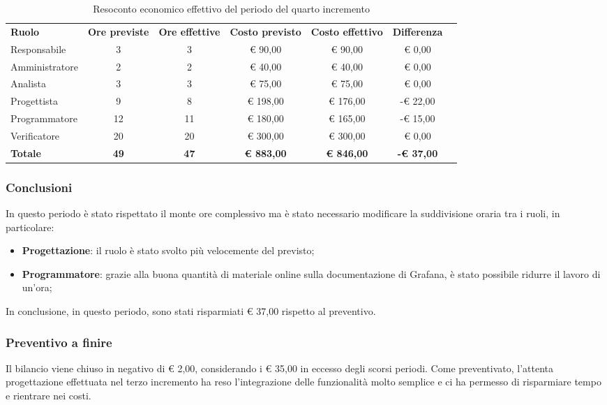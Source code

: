 \documentclass[../piano-di-progetto.tex]{subfiles}
\begin{document}
  \begin{table}[H]
    \centering
    \begin{tabular}{lcccccc}
      \rowcolor{lightgray}
      \textbf{Ruolo}  & \textbf{Ore previste} & \textbf{Ore effettive} & \textbf{Costo previsto} & \textbf{Costo effettivo} & \textbf{Differenza} \\
Responsabile    & 3           & 3           & € 90,00           & € 90,00            & € 0,00            \\
Amministratore  & 2           & 2           & € 40,00           & € 40,00            & € 0,00            \\
Analista        & 3           & 3           & € 75,00           & € 75,00            & € 0,00            \\
Progettista     & 9           & 8           & € 198,00          & € 176,00          & -€ 22,00          \\
Programmatore   & 12          & 11          & € 180,00          & € 165,00          & -€ 15,00          \\
Verificatore    & 20          & 20          & € 300,00          & € 300,00            & € 0,00            \\
\textbf{Totale} & \textbf{49} & \textbf{47} & \textbf{€ 883,00} & \textbf{€ 846,00} & \textbf{-€ 37,00}

    \end{tabular}
    \caption{Resoconto economico effettivo del periodo del quarto incremento}
  \end{table}


\subsubsection{Conclusioni}
In questo periodo è stato rispettato il monte ore complessivo ma è stato necessario modificare la suddivisione oraria tra i ruoli, in particolare:
\begin{itemize}
    \item \textbf{Progettazione}: il ruolo è stato svolto più velocemente del previsto;
    \item \textbf{Programmatore}: grazie alla buona quantità di materiale online sulla documentazione di Grafana, è stato possibile ridurre il lavoro di un'ora;
\end{itemize}
In conclusione, in questo periodo, sono stati risparmiati € 37,00 rispetto al preventivo.

\subsubsection{Preventivo a finire}
Il bilancio viene chiuso in negativo di € 2,00, considerando i € 35,00 in eccesso degli scorsi periodi. Come preventivato, l'attenta progettazione effettuata nel terzo incremento ha reso l'integrazione delle funzionalità molto semplice e ci ha permesso di risparmiare tempo e rientrare nei costi. 
\end{document}
